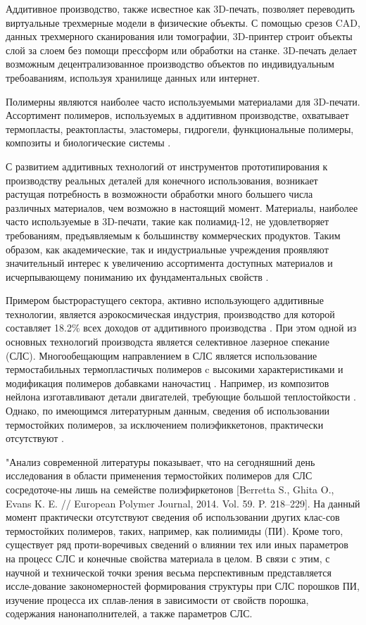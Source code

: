 

Аддитивное производство, также исвестное как 3D-печать, позволяет переводить виртуальные трехмерные модели в физические объекты. С помощью срезов CAD, данных трехмерного сканирования или томографии, 3D-принтер строит объекты слой за слоем без помощи прессформ или обработки на станке. 3D-печать делает возможным децентрализованное производство объектов по индивидуальным требоаваниям, используя хранилище данных или интернет. 

Полимерны являются наиболее часто используемыми материалами для 3D-печати. Ассортимент полимеров, используемых в аддитивном производстве, охватывает термопласты, реактопласты, эластомеры, гидрогели, функциональные полимеры, композиты и биологические системы \cite{3d-review}. 

С развитием аддитивных технологий от инструментов прототипирования к производству реальных деталей для конечного использования, возникает растущая потребность в возможности  обработки много большего числа различных материалов, чем возможно в настоящий момент. Материалы, наиболее часто используемые в 3D-печати, такие как полиамид-12, не удовлетворяет требованиям, предъявляемым к большинству коммерческих продуктов. Таким образом, как академические, так и индустриальные учреждения проявляют значительный интерес к увеличению ассортимента доступных материалов и исчерпывающему пониманию их фундаментальных свойств \cite{sls-material}.

Примером быстрорастущего сектора, активно использующего аддитивные технологии, является аэрокосмическая индустрия, производство для которой составляет 18.2\% всех доходов от аддитивного производства \cite{avia}. При этом одной из основных технологий производста является селективное лазерное спекание (СЛС). Многообещающим направлением в СЛС является использование  термостабильных термопластичых полимеров c высокими характеристиками и модификация полимеров добавками наночастиц \cite{conditions}.  Например, из композитов нейлона изготавливают детали двигателей, требующие большой теплостойкости \cite{avia}. Однако, по имеющимся литературным данным, сведения об использовании термостойких полимеров, за исключением полиэфиккетонов, практически отсутствуют
\cite{peek}. 

  	"Анализ современной литературы показывает, что на сегодняшний день исследования в области применения термостойких полимеров для СЛС сосредоточе-ны лишь на семействе полиэфиркетонов [Berretta S., Ghita O., Evans K. E. // European Polymer Journal, 2014. Vol. 59. P. 218–229]. На данный момент практически отсутствуют сведения об использовании других клас-сов термостойких полимеров, таких, например, как полиимиды (ПИ). 
  Кроме того, существует ряд проти-воречивых сведений о влиянии тех или иных параметров на процесс СЛС и конечные свойства материала в целом. В связи с этим, с научной и технической точки зрения весьма перспективным представляется иссле-дование закономерностей формирования структуры при СЛС порошков ПИ, изучение процесса их сплав-ления в зависимости от свойств порошка, содержания нанонаполнителей, а также параметров СЛС.
\cite{yudin-red}
  
